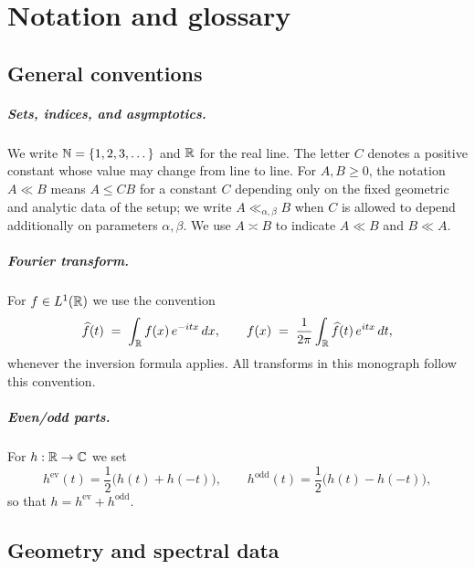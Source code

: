 
\chapter*{Notation and glossary}

\section*{General conventions}

\paragraph{Sets, indices, and asymptotics.}
We write $\mathbb{N}=\{1,2,3,\dots\}$ and $\mathbb{R}$ for the real line.
The letter $C$ denotes a positive constant whose value may change from line to line.
For $A,B\ge 0$, the notation $A\ll B$ means $A\le CB$ for a constant $C$ depending only on the fixed geometric and analytic data of the setup; we write $A\ll_{\alpha,\beta} B$ when $C$ is allowed to depend additionally on parameters $\alpha,\beta$.
We use $A\asymp B$ to indicate $A\ll B$ and $B\ll A$.

\paragraph{Fourier transform.}
For $f\in L^1(\mathbb{R})$ we use the convention
\[
\widehat f(t)\;=\;\int_{\mathbb{R}} f(x)\,e^{-itx}\,dx,
\qquad
f(x)\;=\;\frac1{2\pi}\int_{\mathbb{R}}\widehat f(t)\,e^{itx}\,dt,
\]
whenever the inversion formula applies. All transforms in this monograph follow this convention.

\paragraph{Even/odd parts.}
For $h:\mathbb{R}\to\mathbb{C}$ we set
\[
h^{\mathrm{ev}}(t)=\frac12\bigl(h(t)+h(-t)\bigr),
\qquad
h^{\mathrm{odd}}(t)=\frac12\bigl(h(t)-h(-t)\bigr),
\]
so that $h=h^{\mathrm{ev}}+h^{\mathrm{odd}}$.

\section*{Geometry and spectral data}

